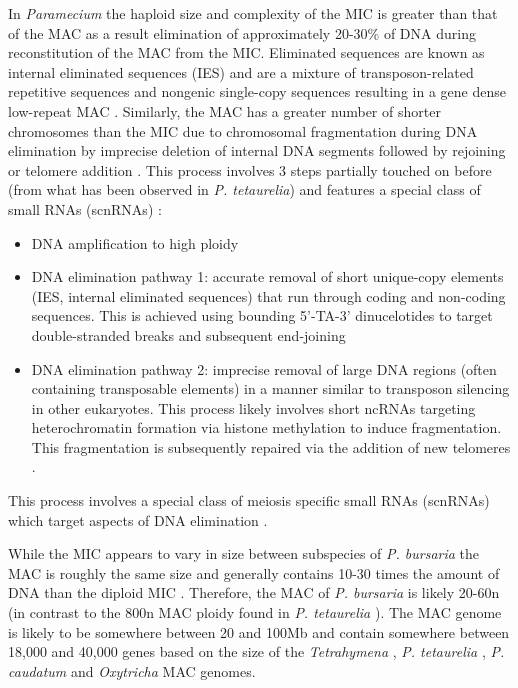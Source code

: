 In \textit{Paramecium} the haploid size and complexity of the MIC is greater than that of the MAC as a result elimination 
of approximately 20-30\% of DNA during reconstitution of the MAC from the MIC.  
Eliminated sequences are known as internal eliminated sequences (IES) and are a mixture of 
transposon-related repetitive sequences and nongenic single-copy sequences resulting in a gene dense low-repeat MAC \citep{Kiefer2013}.   
Similarly, the MAC has a greater number of shorter chromosomes than the MIC due to chromosomal fragmentation during DNA elimination by imprecise
deletion of internal DNA segments followed by rejoining or telomere addition \citep{Kiefer2013}.
This process involves 3 steps partially touched on before (from what has been observed in \textit{P. tetaurelia}) and features
a special class of small RNAs (scnRNAs) \citep{Kiefer2013}:
\begin{itemize}
    \item DNA amplification to high ploidy
    \item DNA elimination pathway 1: accurate removal of short unique-copy elements (IES, internal eliminated sequences) that run through coding and non-coding sequences. This is achieved using bounding 5'-TA-3' dinucelotides to target double-stranded breaks and subsequent end-joining
    \item DNA elimination pathway 2: imprecise removal of large DNA regions (often containing transposable elements) in a manner similar
        to transposon silencing in other eukaryotes.  This process likely involves short ncRNAs targeting heterochromatin formation via histone methylation to induce fragmentation.  This fragmentation is subsequently repaired via the addition of new telomeres \citep{Duret2008}.
\end{itemize}
This process involves a special class of meiosis specific small RNAs (scnRNAs) which target aspects of DNA elimination \citep{Kiefer2013}.


While the MIC appears to vary in size between subspecies of \textit{P. bursaria} the MAC is roughly the same
size and generally contains 10-30 times the amount of DNA than the diploid MIC \citep{Cullis1972}.  
Therefore, the MAC of \textit{P. bursaria} is likely 20-60n (in contrast to the 800n MAC ploidy found in \textit{P. tetaurelia} \citep{Duret2008}).
The MAC genome is likely to be somewhere between 20 and 100Mb and contain somewhere between 
18,000 and 40,000 genes based on the size of the \textit{Tetrahymena} \citep{Eisen2006}, 
\textit{P. tetaurelia} \citep{Aury2006}, \textit{P. caudatum} \citep{McGrath2014} and \textit{Oxytricha} \citep{Swart2013} MAC genomes.

